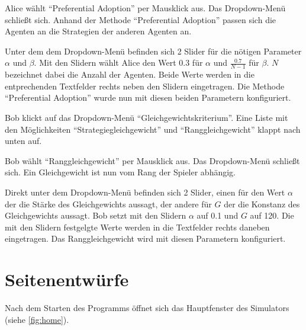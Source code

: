 \documentclass[parskip=full,11pt]{scrartcl}
\begin{document}
{Alice wählt \enquote{Preferential Adoption} per Mausklick aus.}
{Das Dropdown-Menü schließt sich. Anhand der Methode  \enquote{Preferential Adoption} passen sich die Agenten an die Strategien der anderen Agenten an.}

{Unter dem dem Dropdown-Menü befinden sich 2 Slider für die nötigen Parameter \(\alpha\) und \(\beta\). Mit den Slidern wählt Alice den Wert 0.3 für \(\alpha\) und \(\frac{0.7}{N - 1}\) für  \(\beta\). \(N\) bezeichnet dabei die Anzahl der Agenten.}
{Beide Werte werden in die entprechenden Textfelder rechts neben den Slidern eingetragen. Die Methode \enquote{Preferential Adoption} wurde nun mit diesen beiden Parametern konfiguriert.}


{Bob klickt auf das Dropdown-Menü \enquote{Gleichgewichtskriterium}.}
{Eine Liste mit den Möglichkeiten \enquote{Strategiegleichgewicht} und  \enquote{Ranggleichgewicht} klappt nach unten auf.}

{Bob wählt \enquote{Ranggleichgewicht} per Mausklick aus.}
{Das Dropdown-Menü schließt sich. Ein Gleichgewicht ist nun vom Rang der Spieler abhängig.}

{Direkt unter dem Dropdown-Menü befinden sich 2 Slider, einen für den Wert \(\alpha\) der die Stärke des Gleichgewichts aussagt, der andere für \(G\) der die Konstanz des Gleichgewichts aussagt. Bob setzt mit den Slidern \(\alpha\) auf 0.1 und  \(G\) auf 120.}
{Die mit den Slidern festgelgte Werte werden in die Textfelder rechts daneben eingetragen. Das Ranggleichgewicht wird mit diesen Parametern konfiguriert.}

\appendix
\newpage
\section{Seitenentwürfe}

Nach dem Starten des Programms öffnet sich das Hauptfenster des Simulators \\(siehe \cref{fig:home}).
\end{document}
